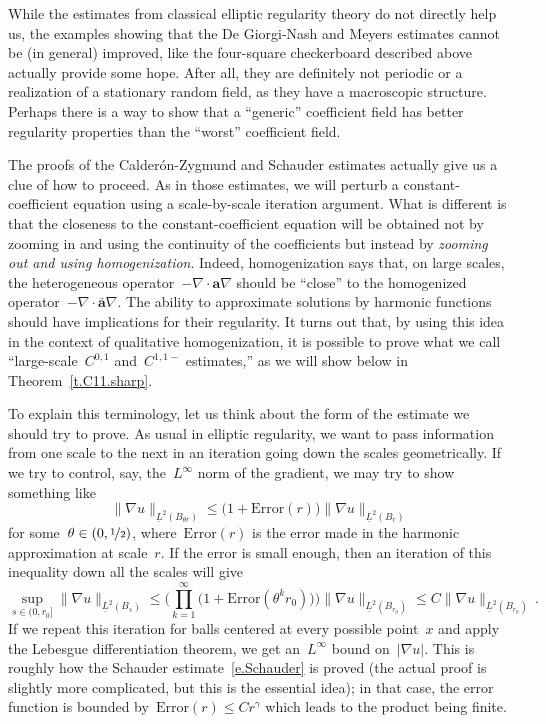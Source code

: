 \documentclass[11pt,twoside]{article} %
\numberwithin{equation}{section}
\theoremstyle{definition}
\renewcommand{\a}{\mathbf{a}}
\newcommand{\ahom}{\bar{\a}}
\begin{document}
\smallskip

While the estimates from classical elliptic regularity theory do not directly help us, the examples showing that the De Giorgi-Nash and Meyers estimates cannot be (in general) improved, like the four-square checkerboard described above actually provide some hope. After all, they are definitely not periodic or a realization of a stationary random field, as they have a macroscopic structure. 
Perhaps there is a way to show that a ``generic'' coefficient field has better regularity properties than the ``worst'' coefficient field. 

\smallskip

The proofs of the Calder\'on-Zygmund and Schauder estimates actually give us a clue of how to proceed. 
As in those estimates, we will perturb a constant-coefficient equation using a scale-by-scale iteration argument. What is different is that the closeness to the constant-coefficient equation will be obtained not by zooming in and using the continuity of the coefficients but instead by \emph{zooming out and using homogenization}. 
Indeed, homogenization says that, on large scales, the heterogeneous operator~$-\nabla \cdot \a\nabla$ should be ``close'' to the homogenized operator~$-\nabla \cdot \ahom\nabla$. 
The ability to approximate solutions by harmonic functions should have implications for their regularity.
It turns out that, by using this idea in the context of qualitative homogenization, it is possible to prove what we call ``large-scale~$C^{0,1}$ and~$C^{1,1-}$ estimates,'' as we will show below in Theorem~\ref{t.C11.sharp}. 

\smallskip

To explain this terminology, let us think about the form of the estimate we should try to prove. 
As usual in elliptic regularity, we want to pass information from one scale to the next in an iteration going down the scales geometrically. 
If we try to control, say, the~$L^\infty$ norm of the gradient, we may try to show something like 
\begin{equation*}
\| \nabla u \|_{\underline{L}^2(B_{\theta r})}
\leq
\bigl( 1 + \mathrm{Error}(r) \bigr)
\| \nabla u \|_{\underline{L}^2(B_r)}
\end{equation*}
for some~$\theta \in (0,\nicefrac12)$, where~$\mathrm{Error}(r)$ is the error made in the harmonic approximation at scale~$r$. 
If the error is small enough, then an iteration of this inequality down all the scales will give
\begin{equation*}
\sup_{s\in (0,r_0]} 
\| \nabla u \|_{\underline{L}^2(B_{s})}
\leq 
\biggl( \prod_{k=1}^\infty
\bigl( 1 + \mathrm{Error}(\theta^k r_0 ) \bigr)
\biggr) \| \nabla u \|_{\underline{L}^2(B_{r_0})}
\leq
C \| \nabla u \|_{\underline{L}^2(B_{r_0})}
\,.
\end{equation*}
If we repeat this iteration for balls centered at every possible point~$x$ and apply the Lebesgue differentiation theorem, we get an~$L^\infty$ bound on~$|\nabla u|$. This is roughly how the Schauder estimate~\eqref{e.Schauder} is proved (the actual proof is slightly more complicated, but this is the essential idea); in that case, the error function is bounded by~$\mathrm{Error}(r) \leq Cr^{\gamma}$ which leads to the product being finite.
\end{document}
